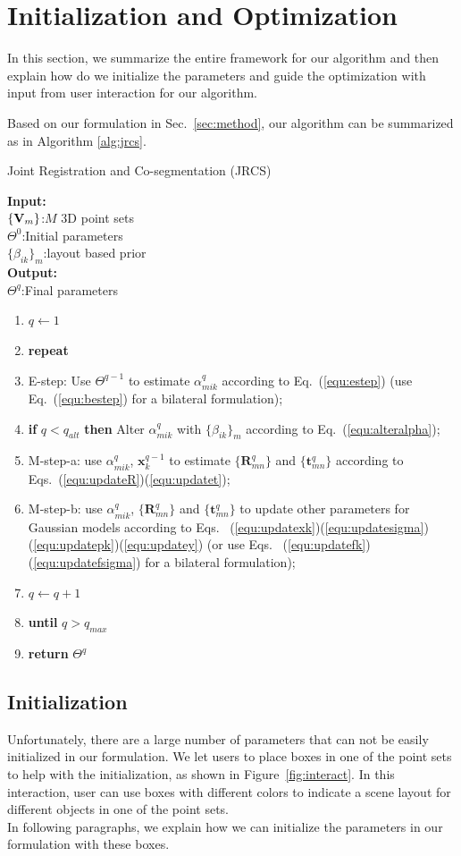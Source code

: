 \section{Initialization and Optimization}
\label{sec:imp}
In this section, we summarize the entire framework for our algorithm and then explain how do we initialize the parameters and guide the optimization with input from user interaction for our algorithm.

Based on our formulation in Sec.~\ref{sec:method}, our algorithm can be summarized as in Algorithm \ref{alg:jrcs}.
\begin{algorithm}[htb]
	\caption{Joint Registration and Co-segmentation (JRCS)}
	\label{alg:jrcs}
	\textbf{Input:}~~\\
	$\{\mathbf{V}_m\}$:$M$ 3D point sets\\
	$\Theta^0$:Initial parameters\\
	$\{\beta_{ik}\}_{m}$:layout based prior\\
	\textbf{Output:}~~\\
	$\Theta^q$:Final parameters~~
	\begin{enumerate}
		\item $q\leftarrow1$
		\item \textbf{repeat}
		\item E-step: Use $\Theta^{q-1}$ to estimate $\alpha_{mik}^q$ according to Eq.~(\ref{equ:estep}) (use Eq.~(\ref{equ:bestep}) for a bilateral formulation);
		\item \textbf{if} $q < q_{alt}$ \textbf{then} Alter $\alpha_{mik}^q$ with $\{\beta_{ik}\}_{m}$ according to Eq.~(\ref{equ:alteralpha});
		\item M-step-a: use $\alpha^q_{mik}$, $\mathbf x^{q-1}_k$ to estimate $\{\mathbf{R}_{mn}^q\}$ and $\{\mathbf t_{mn}^q\}$ according to Eqs.~(\ref{equ:updateR})(\ref{equ:updatet});
		\item M-step-b: use $\alpha^q_{mik}$, $\{\mathbf{R}_{mn}^q\}$ and $\{\mathbf{t}_{mn}^q\}$ to update other parameters for Gaussian models according to Eqs.~ (\ref{equ:updatexk})(\ref{equ:updatesigma})(\ref{equ:updatepk})(\ref{equ:updatey})  (or use Eqs.~ (\ref{equ:updatefk})(\ref{equ:updatefsigma}) for a bilateral formulation);
		\item $q \leftarrow q+1$
		\item \textbf{until} $q > q_{max}$
		\item \textbf{return} $\Theta^q$
	\end{enumerate}
\end{algorithm}
\subsection{Initialization}
\label{sec:imp:interact}
Unfortunately, there are a large number of parameters that can not be easily initialized in our formulation. We let users to place boxes in one of the point sets to help with the initialization, as shown in Figure~\ref{fig:interact}. In this interaction, user can use boxes with different colors to indicate a scene layout for different objects in one of the point sets.\\
In following paragraphs, we explain how we can initialize the parameters in our formulation with these boxes.

